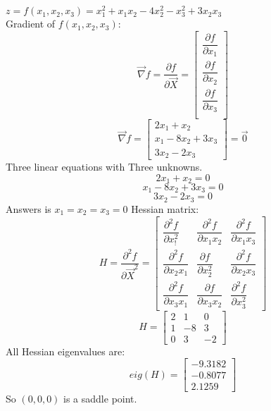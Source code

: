 $z = f(x_1, x_2, x_3) = x_1^2 + x_1x_2 - 4x_2^2-x_3^2 + 3x_2x_3$ \\
Gradient of $f(x_1, x_2, x_3)$:
$$\vec{\nabla} f = \dfrac{\partial f}{\partial \vec{X}}= \begin{bmatrix}
	\dfrac{\partial f}{\partial x_1} \\[8pt]
	\dfrac{\partial f}{\partial x_2} \\[8pt]
	\dfrac{\partial f}{\partial x_3} \\
\end{bmatrix} $$
$$\vec{\nabla} f =   \begin{bmatrix}
	2x_1 + x_2 \\
	x_1 -8x_2 + 3x_3 \\
	3x_2 - 2x_3
\end{bmatrix}  = \vec{0}$$
Three linear equations with Three unknowns.
$$	2x_1 + x_2 = 0 $$
$$x_1 -8x_2 + 3x_3 = 0$$
$$3x_2 - 2x_3 = 0 $$
Answers is $x_1 = x_2 = x_3 = 0$
Hessian matrix:
$$H = \dfrac{\partial^2 f}{\partial \vec{X}^2} = \begin{bmatrix}
	\dfrac{\partial^2 f}{\partial x_!^2} & \dfrac{\partial^2 f}{\partial x_1x_2} & \dfrac{\partial^2 f}{\partial x_1x_3} \\[8pt]
	\dfrac{\partial^2 f}{\partial x_2x_1}  & \dfrac{\partial f}{\partial x_2^2} & \dfrac{\partial^2 f}{\partial x_2x_3}  \\[8pt]
		\dfrac{\partial^2 f}{\partial x_3x_1}  & \dfrac{\partial f}{\partial x_3x_2} & \dfrac{\partial^2 f}{\partial x_3^2} 
\end{bmatrix} $$
$$H = \begin{bmatrix}
	2 & 1 & 0 \\
	1 & -8 & 3 \\
	0 & 3 & -2
\end{bmatrix}$$
All Hessian eigenvalues are:
$$eig(H) = \begin{bmatrix}
	-9.3182  \\
	-0.8077 \\
	2.1259
\end{bmatrix}$$
So $(0, 0, 0)$ is a saddle point.